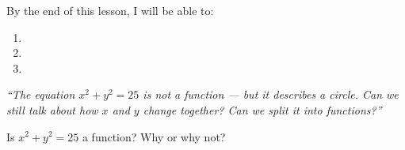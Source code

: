 \documentclass[10pt]{article}
\begin{document}
\namedateperiod

\vspace{0.1in}

\begin{objectivebox}
By the end of this lesson, I will be able to:
\begin{enumerate}[leftmargin=1.5em, itemsep=3pt]
    \item \writeline
    \item \writeline
    \item \writeline
\end{enumerate}
\end{objectivebox}

\vspace{0.08in}

\begin{vocabbox}
\end{vocabbox}

\vspace{0.08in}

\begin{hookbox}
\textit{``The equation $x^2 + y^2 = 25$ is not a function --- but it describes a circle.
Can we still talk about how $x$ and $y$ change together? Can we split it into functions?''}

\vspace{4pt}
Is $x^2 + y^2 = 25$ a function? Why or why not?

\writeline
\end{hookbox}

\vspace{0.08in}
\end{document}
